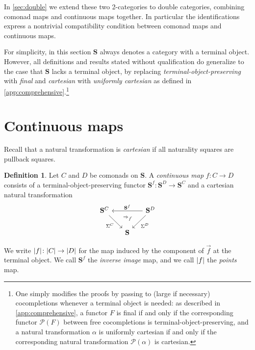 \documentclass[11pt, oneside, article]{memoir}
\theoremstyle{plain}
\theoremstyle{definition}
\newtheorem{definition}[def]{Definition}
\theoremstyle{remark}
\newenvironment{convention}
{\renewcommand\qedsymbol{$\lrcorner$}%
  \pushQED{\qed}\myconvention}
{\popQED\endmyconvention}
\DeclarePairedDelimiter{\abs}{\lvert}{\rvert}
\newcommand{\cat}[1]{\mathbf{#1}}
\newcommand{\CoalgOn}[2]{{#2}^{#1}}
\newcommand{\CoalgS}[1]{\CoalgOn{#1}{\bS}}
\newcommand{\pts}[1]{{\abs{#1}}}
\newcommand{\qpts}[1]{\pts{#1}}
\newcommand{\one}[1]{\pts{#1}}
\newcommand{\carr}{\Sigma}
\newcommand{\car}[1]{\carr^{#1}}
\newcommand{\carC}{\car{\cC}}
\newcommand{\carD}{\car{\cD}}
\newcommand{\con}[2]{{#1}^{#2}}
\newcommand{\connat}[1]{\vec{#1}}
\newcommand{\Coco}[1]{\mathcal{P}(#1)}
\newcommand{\cmnd}[1]{{#1}}
\newcommand{\cC}{\cmnd{C}}
\newcommand{\cD}{\cmnd{D}}
\newcommand{\bS}{\cat{S}}
\newcommand{\CS}{\CoalgS{\cC}}
\newcommand{\DS}{\CoalgS{\cD}}
\newcommand{\conto}{\to}
\newcommand{\final}{terminal-object-preserving}
\newcommand{\cartesian}{cartesian}
\begin{document}
In \cref{sec:double} we extend these two 2-categories to double
categories, combining comonad maps and continuous maps together. In
particular the identifications express a nontrivial compatibility
condition between comonad maps and continuous maps.

\begin{convention}\label{rem:noterminal}
  For simplicity, in this section $\bS$ always denotes a category with
  a terminal object. However, all definitions and results stated
  without qualification do generalize to the case that $\bS$ lacks a
  terminal object, by replacing \emph{terminal-object-preserving} with
  \emph{final} and \emph{cartesian} with \emph{uniformly cartesian} as
  defined in \cref{app:comprehensive}.\footnote{One simply modifies
    the proofs by passing to (large if necessary) cocompletions
    whenever a terminal object is needed: as described in
    \cref{app:comprehensive}, a functor $F$ is final if and only if
    the corresponding functor $\Coco{F}$ between free cocompletions is
    terminal-object-preserving, and a natural transformation $\alpha$
    is uniformly cartesian if and only if the corresponding natural
    transformation $\Coco{\alpha}$ is cartesian.}
\end{convention}

\section{Continuous maps}\label{sec:continuous}

Recall that a natural transformation is \emph{cartesian} if all
naturality squares are pullback squares.

\begin{definition}\label{def:continuous}
  Let $\cC$ and $\cD$ be comonads on $\bS$. A \emph{continuous map}
  $f \colon \cC \conto \cD$ consists of a {\final} functor
  $\con{\bS}{f} \colon \DS \to \CS$ and a {\cartesian} natural transformation
  \[
    \begin{tikzcd}[column sep=15pt]
      \CS && \DS \\
      & \bS
      \arrow["{\con{\bS}{f}}"', from=1-3, to=1-1]
      \arrow["\carC"', ""{name=0, anchor=center, inner sep=0}, from=1-1, to=2-2]
      \arrow["\carD", ""{name=1, anchor=center, inner sep=0}, from=1-3, to=2-2]
      \arrow["\Rightarrow_{\connat{f}}", shift right=10pt, draw=none, from=1, to=0]
    \end{tikzcd}
  \]
  
  We write $\one{f} \colon \qpts{\cC} \to \qpts{\cD}$ for the map induced
  by the component of $\connat{f}$ at the terminal object. We call
  $\con{\bS}{f}$ the \emph{inverse image} map, and we call $\one{f}$
  the \emph{points} map.
\end{definition}
\end{document}
